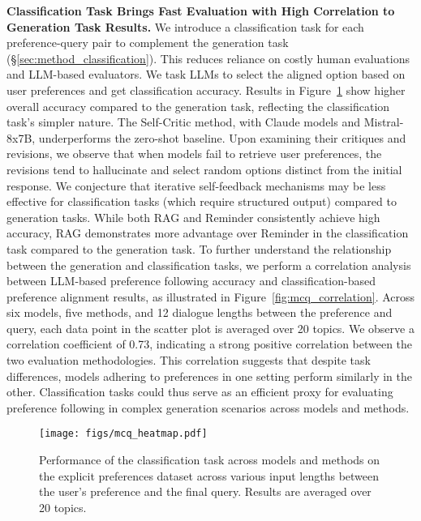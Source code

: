 \textbf{Classification Task Brings Fast Evaluation with High Correlation to Generation Task Results.} We introduce a classification task for each preference-query pair to complement the generation task (\S\ref{sec:method_classification}). This reduces reliance on costly human evaluations and LLM-based evaluators. We task LLMs to select the aligned option based on user preferences and get classification accuracy. Results in Figure~\ref{fig:mcq_all_explicit} show higher overall accuracy compared to the generation task, reflecting the classification task's simpler nature. The Self-Critic method, with Claude models and Mistral-8x7B, underperforms the zero-shot baseline. Upon examining their critiques and revisions, we observe that when models fail to retrieve user preferences, the revisions tend to hallucinate and select random options distinct from the initial response. We conjecture that iterative self-feedback mechanisms may be less effective for classification tasks (which require structured output) compared to generation tasks. While both RAG and Reminder consistently achieve high accuracy, RAG demonstrates more advantage over Reminder in the classification task compared to the generation task. 
To further understand the relationship between the generation and classification tasks, we perform a correlation analysis between LLM-based preference following accuracy and classification-based preference alignment results, as illustrated in Figure~\ref{fig:mcq_correlation}. Across six models, five methods, and 12 dialogue lengths between the preference and query, each data point in the scatter plot is averaged over 20 topics. We observe a correlation coefficient of 0.73, indicating a strong positive correlation between the two evaluation methodologies. This correlation suggests that despite task differences, models adhering to preferences in one setting perform similarly in the other. Classification tasks could thus serve as an efficient proxy for evaluating preference following in complex generation scenarios across models and methods.

\begin{figure}[h]
    \centering
    
        \texttt{[image: figs/mcq\_heatmap.pdf]}
   

   
      \caption{Performance of the classification task across models and methods on the explicit preferences dataset across various input lengths between the user's preference and the final query. Results are averaged over 20 topics.}

\label{fig:mcq_all_explicit}
\end{figure}





